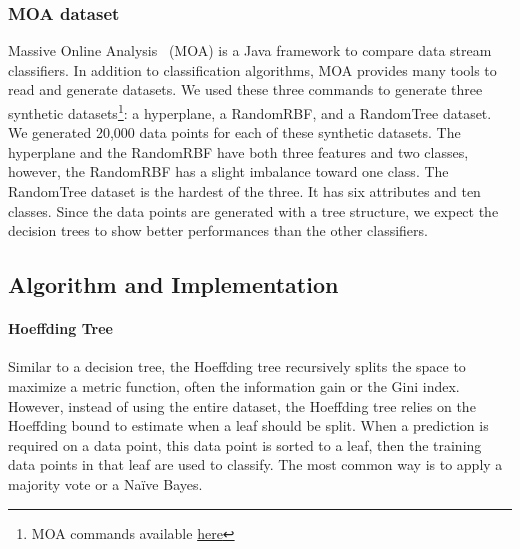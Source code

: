 \subsubsection{MOA dataset}
Massive Online Analysis~\cite{moa} (MOA) is a Java framework to compare
data stream classifiers. In addition to classification algorithms, MOA provides many
tools to read and generate datasets.
We used these three commands to
generate three synthetic datasets\footnote{MOA commands available
\href{https://github.com/azazel7/paper-benchmark/blob/e0c9a94d0d17490f7ab14293dec20b8322a6447c/Makefile\#L90}{here}}:
a hyperplane, a RandomRBF, and a RandomTree
dataset. We generated 20,000 data points
 for each of these synthetic datasets.
The hyperplane and the RandomRBF have both three features and two classes, however, the RandomRBF has a slight imbalance toward one class.
The RandomTree dataset is the hardest of the three. It has six attributes and
ten classes. Since the data points are generated with a tree structure, we
expect the decision trees to show better performances than the other
classifiers.

\subsection{Algorithm and Implementation}
\paragraph{Hoeffding Tree~\cite{VFDT}}
Similar to a decision tree, the Hoeffding tree recursively splits the space to maximize a
metric function, often the
information gain or the Gini index. However,
instead of using the entire dataset, the Hoeffding
tree relies on the Hoeffding bound to estimate
when a leaf should be split. When a prediction is required on a
data point, this data point is sorted to a leaf,
then the training data points in that leaf are
used to classify. The most common way is to apply a
majority vote or a Naïve Bayes.

